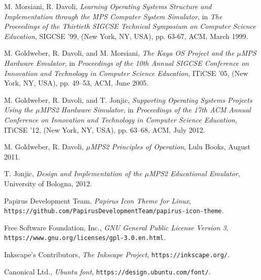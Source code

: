 \documentclass[12pt,a4paper,openright,twoside]{report}
\begin{document}
\begin{thebibliography}{99}

	M. Morsiani, R. Davoli,
	\textit{Learning Operating Systems Structure and Implementation through the MPS Computer System Simulator},
	in \textit{The Proceedings of the Thirtieth SIGCSE Technical Symposium on Computer Science Education},
	SIGCSE ’99, (New York, NY, USA), pp. 63-67, ACM, March 1999.

	M. Goldweber, R. Davoli, and M. Morsiani,
	\textit{The Kaya OS Project and the $\mu$MPS Hardware Emulator},
	in \textit{Proceedings of the 10th Annual SIGCSE Conference on Innovation and Technology in Computer Science Education},
	ITiCSE ’05, (New York, NY, USA), pp. 49–53, ACM, June 2005.

	M. Goldweber, R. Davoli, and T. Jonjic,
	\textit{Supporting Operating Systems Projects Using the $\mu$MPS2 Hardware Simulator},
	in \textit{Proceedings of the 17th ACM Annual Conference on Innovation and Technology in Computer Science Education},
	ITiCSE ’12, (New York, NY, USA), pp. 63–68, ACM, July 2012.

	M. Goldweber, R. Davoli,
	\textit{$\mu$MPS2 Principles of Operation},
	Lulu Books, August 2011.

	T. Jonjic,
	\textit{Design and Implementation of the $\mu$MPS2 Educational Emulator},
	University of Bologna, 2012.

	Papirus Development Team,
	\textit{Papirus Icon Theme for Linux},
	\texttt{https://github.com/PapirusDevelopmentTeam/papirus-icon-theme}.

	Free Software Foundation, Inc.,
	\textit{GNU General Public License Version 3},
	\texttt{https://www.gnu.org/licenses/gpl-3.0.en.html}.

	Inkscape's Contributors,
	\textit{The Inkscape Project},
	\texttt{https://inkscape.org/}.

	Canonical Ltd.,
	\textit{Ubuntu font},
	\texttt{https://design.ubuntu.com/font/}.

\end{thebibliography}
\end{document}
